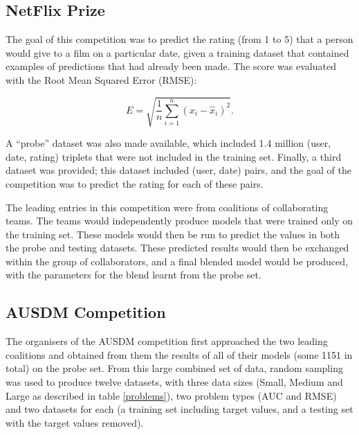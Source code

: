 \documentclass{article}
\begin{document}
\subsection{NetFlix Prize}

The goal of this competition was to predict the rating (from 1 to 5) that a person would give to a film on a particular date, given a training dataset that contained examples of predictions that had already been made.  The score was evaluated with the Root Mean Squared Error (RMSE):

\begin{equation}
E = \sqrt{\frac{1}{n} \sum_{i=1}^{n} (x_i - \hat{x}_i)^2} \label{RMSE}.
\end{equation}

A ``probe'' dataset was also made available, which included 1.4 million (user, date, rating) triplets that were not included in the training set.  Finally, a third dataset was provided; this dataset included (user, date) pairs, and the goal of the competition was to predict the rating for each of these pairs.

The leading entries in this competition were from coalitions of collaborating teams.  The teams would independently produce models that were trained only on the training set.  These models would then be run to predict the values in both the probe and testing datasets.  These predicted results would then be exchanged within the group of collaborators, and a final blended model would be produced, with the parameters for the blend learnt from the probe set.

\subsection{AUSDM Competition}

The organisers of the AUSDM competition first approached the two leading coalitions and obtained from them the results of all of their models (some 1151 in total) on the probe set.  From this large combined set of data, random sampling was used to produce twelve datasets, with three data sizes (Small, Medium and Large as described in table \ref{problems}), two problem types (AUC and RMSE) and two datasets for each (a training set including target values, and a testing set with the target values removed).
\end{document}
